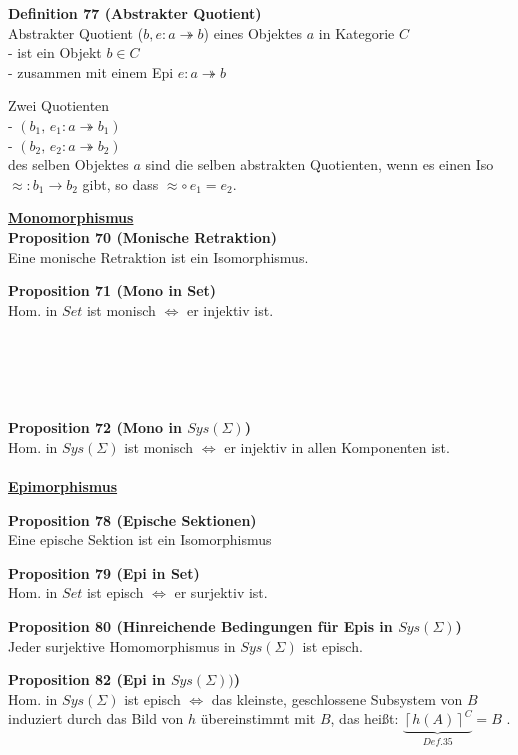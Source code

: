 \begin{multicols}{2}{}
\textbf{Definition 77 (Abstrakter Quotient)} \\
Abstrakter Quotient ($b,e: a \twoheadrightarrow b$)  eines Objektes $a$ in Kategorie $C$ \\ - ist ein Objekt $b \in C$ \\ - zusammen mit einem Epi $e:a \twoheadrightarrow b$

Zwei Quotienten \\ - $(b_{1},\, e_{1}:a \twoheadrightarrow b_1)$ \\
- $(b_{2},\, e_{2}:a \twoheadrightarrow b_2)$  \\ 
des selben Objektes $a$ sind die selben abstrakten Quotienten, wenn es einen Iso $\approx:b_{1}\rightarrow b_{2}$ gibt, so dass $ \approx \circ \, e_{1}=e_{2} $.


\end{multicols}
\newpage

\begin{multicols}{2}

\textbf{\underline{Monomorphismus}} \\

\textbf{Proposition 70 (Monische Retraktion)} \\
Eine monische Retraktion ist ein Isomorphismus.

\textbf{Proposition 71 (Mono in Set)} \\
Hom. in $Set$ ist monisch $\Leftrightarrow$  er injektiv ist. \\
\\
\\
\\
\\
\\

\textbf{Proposition 72 (Mono in $Sys(\Sigma)$)} \\
Hom. in $Sys(\Sigma)$ ist monisch $\Leftrightarrow$  er injektiv in allen Komponenten ist.
\\
\\

\columnbreak
\textbf{\underline{Epimorphismus}}

\textbf{Proposition 78 (Epische Sektionen)} \\
Eine epische Sektion ist ein Isomorphismus

\textbf{Proposition 79 (Epi in Set)} \\
Hom. in $Set$ ist episch $\Leftrightarrow$ er surjektiv ist.

\textbf{Proposition 80 (Hinreichende Bedingungen für Epis in $Sys(\Sigma)$)} \\
Jeder surjektive Homomorphismus in $Sys(\Sigma)$ ist episch.

\textbf{Proposition 82 (Epi in $Sys(\Sigma))$)} \\
Hom. in $Sys(\Sigma)$ ist episch $\Leftrightarrow$  das kleinste, geschlossene Subsystem von $B$ induziert durch das Bild von $h$ übereinstimmt mit $B$, das heißt: $\underbrace{\left\lceil h(A)\right\rceil ^{C}}_{Def. 35} =B$ .

\end{multicols}

